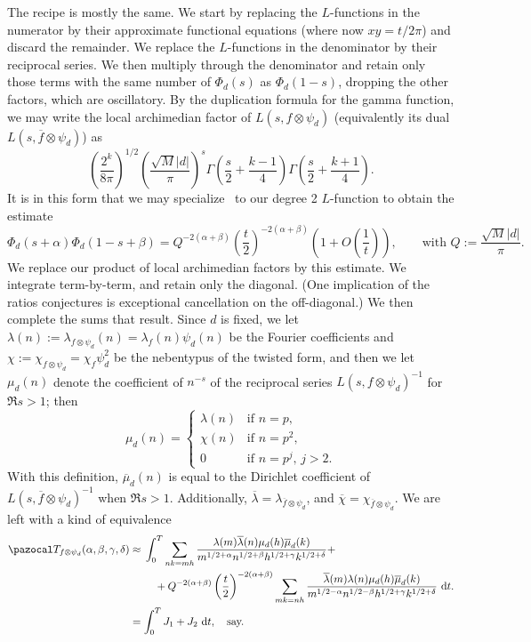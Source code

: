\documentclass[11pt,reqno]{amsart} \usepackage{fullpage}
\renewcommand{\d}[1]{\,\operatorname*{d}\!{#1}}
\newcommand\be{\begin{equation}}
\newcommand\ee{\end{equation}}
\newcommand{\T}{\pazocal T_{f\otimes\psi_d}(\alpha,\beta,\gamma,\delta)}
\newcommand{\gf}{\Phi_d}
\newcommand{\gfactor}[2][]{\gf#1\left(#2\right)}
\numberwithin{equation}{section}
\begin{document}
The recipe is mostly the same. We start by replacing the $L$-functions in the numerator by
their approximate functional equations (where now $xy=t/2\pi$) and discard the remainder.
We replace the $L$-functions in the denominator by their reciprocal series.
We then multiply through the denominator and retain only those terms with the same number
of $\gfactor{s}$ as $\gfactor{1-s}$, dropping the other factors, which are oscillatory.
By the duplication formula for the gamma function, we may write the local archimedian
factor of $L(s,f\otimes\psi_d)$ (equivalently its dual $L(s,\overline f\otimes\psi_d)$) as
\be\left(\frac{2^k}{8\pi}\right)^{1/2}\left(\frac{\sqrt M |d|}{\pi}\right)^s
\Gamma\left(\frac s2+\frac{k-1}4\right)\Gamma\left(\frac s2+\frac{k+1}4\right).\ee
It is in this form that we may specialize~\cite[Lemma 6.5]{ours} to our degree 2
$L$-function to obtain the estimate
\be\gfactor{s+\alpha}\gfactor{1-s+\beta}=Q^{-2(\alpha+\beta)}
\left(\frac t2\right)^{-2(\alpha+\beta)}\left(1+O\left(\frac1t\right)\right),
\qquad\text{with }\label{eq:defQ} Q:=\frac{\sqrt M|d|}{\pi}.\ee
We replace our product of local archimedian factors by this estimate.
We integrate term-by-term, and retain only the diagonal. (One implication of the ratios
conjectures is exceptional cancellation on the off-diagonal.) We then complete the sums
that result. Since $d$ is fixed, we let
$\lambda(n):=\lambda_{f\otimes\psi_d}(n)=\lambda_f(n)\psi_d(n)$ be the Fourier coefficients
and $\chi:=\chi_{f\otimes\psi_d}=\chi_f\psi_d^2$ be the nebentypus of the twisted form,
and then we let $\mu_d(n)$ denote the coefficient of $n^{-s}$ of the reciprocal series
$L(s,f\otimes\psi_d)^{-1}$ for $\Re s>1$; then
\be\mu_d(n)=\begin{cases}\lambda(n)&\text{if $n=p$,} \\ \chi(n)&\text{if $n=p^2$,} \\
  0&\text{if $n=p^j$, $j>2$.}\end{cases}\ee With this definition, $\overline \mu_d(n)$ is
equal to the Dirichlet coefficient of $L(s,\overline f\otimes\psi_d)^{-1}$ when $\Re s>1$.
Additionally, $\overline\lambda=\lambda_{\overline f\otimes\psi_d}$, and
$\overline\chi=\chi_{\overline f\otimes\psi_d}$. We are left with a kind of equivalence
\be\begin{aligned}[t]\T&\approx
  \begin{multlined}[t]\int_0^T\sum_{nk=mh}\frac{\lambda(m)\overline\lambda(n)
      \mu_d(h)\overline\mu_d(k)}{m^{1/2+\alpha}n^{1/2+\beta}h^{1/2+\gamma}k^{1/2+\delta}}
  + \\ +
  Q^{-2(\alpha+\beta)}\left(\frac t2\right)^{-2(\alpha+\beta)}
  \sum_{mk=nh}\frac{\overline\lambda(m)\lambda(n)\mu_d(h)\overline\mu_d(k)}
  {m^{1/2-\alpha}n^{1/2-\beta}h^{1/2+\gamma}k^{1/2+\delta}}\d t.\end{multlined} \\
  &=\int_0^T J_1 + J_2 \d t,\quad\text{say.}\end{aligned}\ee
\end{document}

